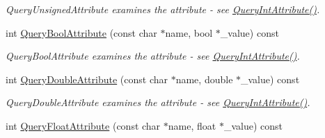 \begin{DoxyCompactItemize}
\begin{DoxyCompactList}\small\item\em Query\+Unsigned\+Attribute examines the attribute -\/ see \hyperlink{class_ti_xml_element_aea0bfe471380f281c5945770ddbf52b9}{Query\+Int\+Attribute()}. \end{DoxyCompactList}\item 
int \hyperlink{class_ti_xml_element_af4a1d3f88c28eb0f3115dc39ebd83fff}{Query\+Bool\+Attribute} (const char $\ast$name, bool $\ast$\+\_\+value) const 
\begin{DoxyCompactList}\small\item\em Query\+Bool\+Attribute examines the attribute -\/ see \hyperlink{class_ti_xml_element_aea0bfe471380f281c5945770ddbf52b9}{Query\+Int\+Attribute()}. \end{DoxyCompactList}\item 
int \hyperlink{class_ti_xml_element_a898d7730ecc341f0bffc7a9dadbf1ce7}{Query\+Double\+Attribute} (const char $\ast$name, double $\ast$\+\_\+value) const \hypertarget{class_ti_xml_element_a898d7730ecc341f0bffc7a9dadbf1ce7}{}\label{class_ti_xml_element_a898d7730ecc341f0bffc7a9dadbf1ce7}

\begin{DoxyCompactList}\small\item\em Query\+Double\+Attribute examines the attribute -\/ see \hyperlink{class_ti_xml_element_aea0bfe471380f281c5945770ddbf52b9}{Query\+Int\+Attribute()}. \end{DoxyCompactList}\item 
int \hyperlink{class_ti_xml_element_aa04d3af11601ef5a5f88295203a843be}{Query\+Float\+Attribute} (const char $\ast$name, float $\ast$\+\_\+value) const \hypertarget{class_ti_xml_element_aa04d3af11601ef5a5f88295203a843be}{}\label{class_ti_xml_element_aa04d3af11601ef5a5f88295203a843be}


\end{DoxyCompactItemize}
